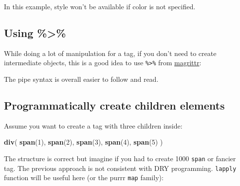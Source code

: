 \documentclass[
]{book}
\newenvironment{Shaded}{\begin{snugshade}}{\end{snugshade}}
\newcommand{\DataTypeTok}[1]{\textcolor[rgb]{0.13,0.29,0.53}{#1}}
\newcommand{\DecValTok}[1]{\textcolor[rgb]{0.00,0.00,0.81}{#1}}
\newcommand{\KeywordTok}[1]{\textcolor[rgb]{0.13,0.29,0.53}{\textbf{#1}}}
\newcommand{\NormalTok}[1]{#1}
\newcommand{\OperatorTok}[1]{\textcolor[rgb]{0.81,0.36,0.00}{\textbf{#1}}}
\newcommand{\StringTok}[1]{\textcolor[rgb]{0.31,0.60,0.02}{#1}}
\begin{document}
In this example, style won't be available if color is not specified.

\hypertarget{using}{%
\subsection{Using \%\textgreater\%}\label{using}}

While doing a lot of manipulation for a tag, if you don't need to create intermediate
objects, this is a good idea to use \texttt{\%\textgreater{}\%} from \href{https://magrittr.tidyverse.org}{magrittr}:

\begin{Shaded}
\end{Shaded}

The pipe syntax is overall easier to follow and read.

\hypertarget{programmatically-create-children-elements}{%
\subsection{Programmatically create children elements}\label{programmatically-create-children-elements}}

Assume you want to create a tag with three children inside:

\begin{Shaded}
\begin{Highlighting}[]
\KeywordTok{div}\NormalTok{(}
  \KeywordTok{span}\NormalTok{(}\DecValTok{1}\NormalTok{),}
  \KeywordTok{span}\NormalTok{(}\DecValTok{2}\NormalTok{),}
  \KeywordTok{span}\NormalTok{(}\DecValTok{3}\NormalTok{),}
  \KeywordTok{span}\NormalTok{(}\DecValTok{4}\NormalTok{),}
  \KeywordTok{span}\NormalTok{(}\DecValTok{5}\NormalTok{)}
\NormalTok{)}
\end{Highlighting}
\end{Shaded}

The structure is correct but imagine if you had to create 1000 \texttt{span} or fancier tag. The previous approach is not consistent with DRY programming. \texttt{lapply} function will be useful here (or the purrr \texttt{map} family):
\end{document}
